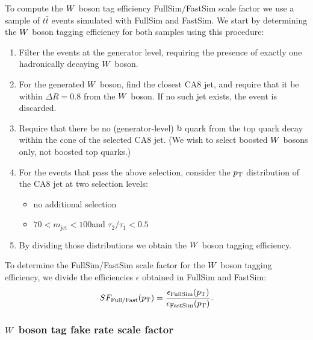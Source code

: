 To compute the $W$ boson tag efficiency FullSim/FastSim scale factor we use a sample of $t\bar{t}$
events simulated with FullSim and FastSim. 
We start by determining the $W$ boson tagging efficiency for both samples using this procedure: 
\begin{enumerate}
\item Filter the events at the generator level, requiring the presence of exactly one hadronically
decaying $W$ boson. 
\item For the generated $W$ boson, find the closest CA8 jet, and require that it be within $\Delta
R = 0.8$ from the $W$ boson. If no such jet exists, the event is discarded.  
\item Require that there be no (generator-level) $\mathrm{b}$ quark from the top quark decay within the
cone of the selected CA8 jet. (We wish to select boosted $W$ bosons only, not boosted top quarks.)
\item For the events that pass the above selection, consider the $p_{\mathrm{T}}$ distribution of the CA8 jet
at two selection levels:
 \begin{itemize}
   \item no additional selection
   \item $70 < m_\textrm{jet} < 100$\GeV and $\tau_2/\tau_1 < 0.5$
 \end{itemize}
\item By dividing those \pt distributions we obtain the $W$ boson tagging efficiency. 
\end{enumerate}
To determine the FullSim/FastSim scale factor for the $W$ boson tagging efficiency, we divide the
efficiencies $\epsilon$ obtained in FullSim and FastSim:
\begin{equation}
SF_{\textrm{Full/Fast}}(p_{\mathrm{T}}) =
\frac{\epsilon_{\textrm{FullSim}}(p_{\mathrm{T}})}{\epsilon_{\textrm{FastSim}}(p_{\mathrm{T}})}.
\end{equation}


\subsubsection{\texorpdfstring{$W$}{W} boson tag fake rate scale factor \label{sec:wtag_fake_sf}}


